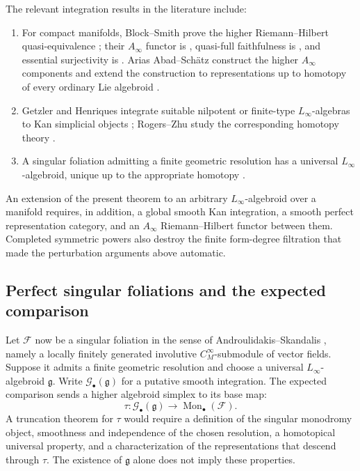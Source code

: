 \documentclass[12pt]{amsart}
\theoremstyle{definition}
\theoremstyle{remark}
\numberwithin{equation}{section}
\newcommand{\CF}{{\mathcal F}}
\newcommand{\1}{{\mathbb{1}}}
\begin{document}
The relevant integration results in the literature include:
\begin{enumerate}
 \item For compact manifolds, Block--Smith prove the higher
 Riemann--Hilbert quasi-equivalence \cite[Theorem 4.1]{BS14}; their
 $A_\infty$ functor is \cite[Theorem 4.2]{BS14}, quasi-full
 faithfulness is \cite[Proposition 4.3]{BS14}, and essential
 surjectivity is \cite[Theorem 4.5]{BS14}.  Arias
 Abad--Sch\"atz construct the higher $A_\infty$ components and extend
 the construction to representations up to homotopy of every ordinary
 Lie algebroid \cite[Definition 4.16 and Theorem 4.18]{AS12}.
 \item Getzler and Henriques integrate suitable nilpotent or
 finite-type $L_\infty$-algebras to Kan simplicial objects
 \cite{Get09,Hen08}; Rogers--Zhu study the corresponding homotopy
 theory \cite{RZ20}.
 \item A singular foliation admitting a finite geometric resolution
 has a universal $L_\infty$-algebroid, unique up to the appropriate
 homotopy \cite{Lav18,LLS20}.
\end{enumerate}
An extension of the present theorem to an arbitrary
$L_\infty$-algebroid over a manifold requires, in addition, a global
smooth Kan integration, a smooth perfect representation category, and
an $A_\infty$ Riemann--Hilbert functor between them.  Completed
symmetric powers also destroy the finite form-degree filtration that
made the perturbation arguments above automatic.

\subsection{Perfect singular foliations and the expected comparison}

Let $\CF$ now be a singular foliation in the sense of
Androulidakis--Skandalis \cite{AS06}, namely a locally finitely
generated involutive $C^\infty_M$-submodule of vector fields.  Suppose
it admits a finite geometric resolution and choose a universal
$L_\infty$-algebroid $\mathfrak g$.  Write
$\mathcal G_\bullet(\mathfrak g)$ for a putative smooth integration.
The expected comparison sends a higher algebroid simplex to its base
map:
\[
 \tau:
 \mathcal G_\bullet(\mathfrak g)
 \longrightarrow
 \operatorname{Mon}_\bullet(\CF).
\]
A truncation theorem for $\tau$ would require a definition of the
singular monodromy object, smoothness and independence of the chosen
resolution, a homotopical universal property, and a characterization
of the representations that descend through $\tau$.  The existence of
$\mathfrak g$ alone does not imply these properties.
\end{document}
